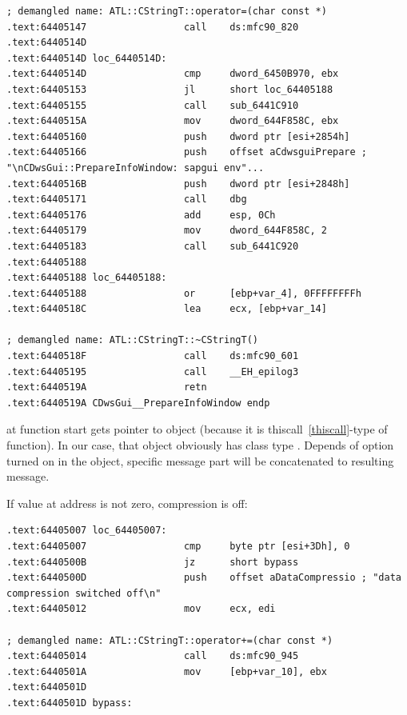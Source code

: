\begin{lstlisting}
; demangled name: ATL::CStringT::operator=(char const *)
.text:64405147                 call    ds:mfc90_820
.text:6440514D
.text:6440514D loc_6440514D:
.text:6440514D                 cmp     dword_6450B970, ebx
.text:64405153                 jl      short loc_64405188
.text:64405155                 call    sub_6441C910
.text:6440515A                 mov     dword_644F858C, ebx
.text:64405160                 push    dword ptr [esi+2854h]
.text:64405166                 push    offset aCdwsguiPrepare ; "\nCDwsGui::PrepareInfoWindow: sapgui env"...
.text:6440516B                 push    dword ptr [esi+2848h]
.text:64405171                 call    dbg
.text:64405176                 add     esp, 0Ch
.text:64405179                 mov     dword_644F858C, 2
.text:64405183                 call    sub_6441C920
.text:64405188
.text:64405188 loc_64405188:
.text:64405188                 or      [ebp+var_4], 0FFFFFFFFh
.text:6440518C                 lea     ecx, [ebp+var_14]

; demangled name: ATL::CStringT::~CStringT()
.text:6440518F                 call    ds:mfc90_601
.text:64405195                 call    __EH_epilog3
.text:6440519A                 retn
.text:6440519A CDwsGui__PrepareInfoWindow endp
\end{lstlisting}

{\ECX at function start gets pointer to object (because it is thiscall~\ref{thiscall}-type of function). 
In our case, that object obviously has class type . 
Depends of option turned on in the object, specific message part will be concatenated to resulting message.}

{If value at  address is not zero, compression is off}:

\begin{lstlisting}
.text:64405007 loc_64405007:
.text:64405007                 cmp     byte ptr [esi+3Dh], 0
.text:6440500B                 jz      short bypass
.text:6440500D                 push    offset aDataCompressio ; "data compression switched off\n"
.text:64405012                 mov     ecx, edi

; demangled name: ATL::CStringT::operator+=(char const *)
.text:64405014                 call    ds:mfc90_945
.text:6440501A                 mov     [ebp+var_10], ebx
.text:6440501D
.text:6440501D bypass:
\end{lstlisting}

